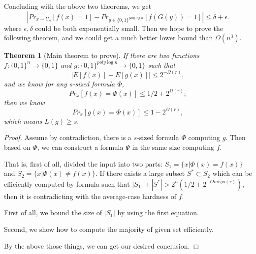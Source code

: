 \documentclass[12pt]{article}
\newtheorem{theorem}{Theorem}[section]
\renewcommand{\.}{,\ldots,}
\begin{document}
Concluding with the above two theorems, we get 
$$|Pr_{x\sim U_n}[f(x)=1]-Pr_{y\in\{0,1\}^{poly\log n}}[f(G(y))=1]|\leq \delta+\epsilon.$$
where $\epsilon, \delta$ could be both exponentially small. Then we hope to prove the following theorem, and we could get a much better lower bound than $\Omega(n^3)$.
\begin{theorem}[Main theorem to prove]
If there are two functions $f:\{0,1\}^n\rightarrow \{0,1\}$ and $g:\{0,1\}^{poly\log n}\rightarrow \{0,1\}$ such that $$|E[f(x)]-E[g(x)]|\leq 2^{-\Omega (r)},$$ and we know for any $s$-sized formula $\Phi$, $$Pr_x[f(x)=\Phi(x)]\leq 1/2+2^{\Omega (r)};$$  then we know 
$$Pr_x[g(x)=\Phi(x)]\leq 1-2^{\Omega(r)},$$
 which means $L(g)\geq s.$
 
\end{theorem}
\begin{proof}
Assume by contradiction, there is a $s$-sized formula $\Phi$ computing $g$. Then based on $\Phi$, we can construct a formula $\Psi$ in the same size computing $f$. 

That is, first of all, divided the input into two parts: $S_1=\{x|\Phi(x)=f(x)\}$ and 
$S_2=\{x|\Phi(x)\neq f(x)\}$. If there exists a large subset $S^*\subset S_2$ which can be efficiently computed by formula such that $|S_1|+|S^*|> 2^n(1/2+2^{-Omega(r)})$, then it is contradicting with the average-case hardness of $f$. 

First of all, we bound the size of $|S_1|$ by using the first equation. 

Second, we show how to compute the majority of given set efficiently. 

By the above those things, we can get our desired conclusion. 
\end{proof}


\end{document}
